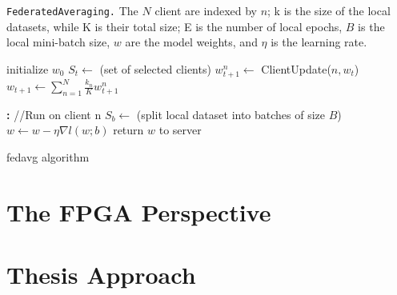 \begin{algorithm}[H]
    \caption[FederatedAveraging]{\texttt{FederatedAveraging.} The \(N\) client are indexed by \(n\); k is the size of the local datasets, while K is their total size; E is the number of local epochs, \(B\) is the local mini-batch size, \(w\) are the model weights, and \(\eta\) is the learning rate.}
    \label{alg:FederatedAveraging}
    \begin{algorithmic}
            \State initialize $w_0$
                \State $S_{t} \gets$ (set of selected clients)
                    \State $w_{t+1}^n \gets$ ClientUpdate($n,w_t$)
                \EndFor
                \State $w_{t+1} \gets \sum_{n=1}^{N} \frac{k_n}{K} w_{t+1}^n$
            \EndFor
        \EndFunction
        
        \textbf{:} //Run on client n
            \State $S_b \gets $ (split local dataset into batches of size $B$)
                    \State $w \gets w - \eta \nabla l(w;b)$
                \EndFor
            \EndFor
            \State return $w$ to server
        \EndFunction
    \end{algorithmic}
\end{algorithm}

fedavg algorithm

\section{The FPGA Perspective}
\section{Thesis Approach}
